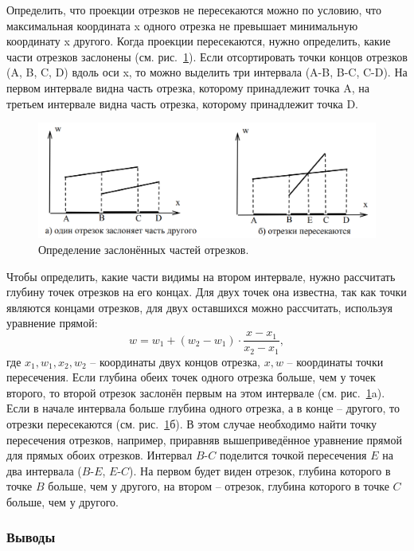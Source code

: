 Определить, что проекции отрезков не пересекаются можно по условию, что максимальная координата x одного отрезка не превышает минимальную координату x другого. Когда проекции пересекаются, нужно определить, какие части отрезков заслонены (см. рис.~\ref{fig:Sbuff_algorithm_2}). Если отсортировать точки концов отрезков (A, B, C, D) вдоль оси x, то можно выделить три интервала (A-B, B-C, C-D). На первом интервале видна часть отрезка, которому принадлежит точка A, на третьем интервале видна часть отрезка, которому принадлежит точка D.

\begin{figure}[H]
    \centering
    \includegraphics[width=\textwidth]{img/Sbuff_algorithm_2.png}
    \caption{Определение заслонённых частей отрезков.}
    \label{fig:Sbuff_algorithm_2}
\end{figure}

Чтобы определить, какие части видимы на втором интервале, нужно рассчитать глубину точек отрезков на его концах. Для двух точек она известна, так как точки являются концами отрезков, для двух оставшихся
можно рассчитать, используя уравнение прямой:
\[
w = w_1 + (w_2 - w_1) \cdot \frac{x - x_1}{x_2 - x_1},
\]
где $x_1, w_1, x_2, w_2$ – координаты двух концов отрезка, $x, w$ – координаты точки пересечения. Если глубина обеих точек одного отрезка больше, чем у точек второго, то второй отрезок заслонён первым на этом интервале (см. рис.~\ref{fig:Sbuff_algorithm_2}a). Если в начале интервала больше глубина одного отрезка, а в конце – другого, то отрезки пересекаются (см. рис.~\ref{fig:Sbuff_algorithm_2}б). В этом случае необходимо найти точку пересечения отрезков, например, приравняв вышеприведённое уравнение прямой для прямых обоих отрезков. Интервал $B$-$C$ поделится точкой пересечения $E$ на два интервала ($B$-$E$, $E$-$C$). На первом будет виден отрезок, глубина которого в точке $B$ больше, чем у другого, на втором – отрезок, глубина которого в точке $C$ больше, чем у другого.~\cite{polski}

\subsubsection{Выводы}

